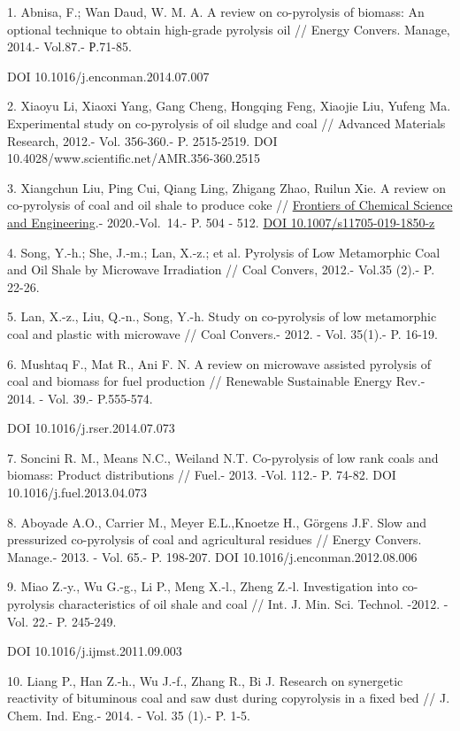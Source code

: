 \begin{references}
1. Abnisa, F.; Wan Daud, W. M. A. A review on co-pyrolysis of biomass:
An optional technique to obtain high-grade pyrolysis oil // Energy
Convers. Manage, 2014.- Vol.87.- Р.71-85.

DOI 10.1016/j.enconman.2014.07.007

2. Xiaoyu Li, Xiaoxi Yang, Gang Cheng, Hongqing Feng, Xiaojie Liu,
Yufeng Ma. Experimental study on co-pyrolysis of oil sludge and coal //
Advanced Materials Research, 2012.- Vol. 356-360.- P. 2515-2519. DOI
10.4028/www.scientific.net/AMR.356-360.2515

3. Xiangchun Liu, Ping Cui, Qiang Ling, Zhigang Zhao, Ruilun Xie. A
review on co-pyrolysis of coal and oil shale to produce coke //
\href{https://link.springer.com/journal/11705}{Frontiers of Chemical
Science and Engineering}.- 2020.-Vol.~14.- P. 504 - 512.
\href{https://doi.org/10.1007/s11705-019-1850-z}{DOI
10.1007/s11705-019-1850-z}

4. Song, Y.-h.; She, J.-m.; Lan, X.-z.; et al. Pyrolysis of Low
Metamorphic Coal and Oil Shale by Microwave Irradiation // Coal Convers,
2012.- Vol.35 (2).- P. 22-26.

5. Lan, X.-z., Liu, Q.-n., Song, Y.-h. Study on co-pyrolysis of low
metamorphic coal and plastic with microwave // Coal Convers.- 2012. -
Vol. 35(1).- P. 16-19.

6. Mushtaq F., Mat R., Ani F. N. A review on microwave assisted
pyrolysis of coal and biomass for fuel production // Renewable
Sustainable Energy Rev.- 2014. - Vol. 39.- P.555-574.

DOI 10.1016/j.rser.2014.07.073

7. Soncini R. M., Means N.C., Weiland N.T. Co-pyrolysis of low rank
coals and biomass: Product distributions // Fuel.- 2013. -Vol. 112.- P.
74-82. DOI 10.1016/j.fuel.2013.04.073

8. Aboyade A.O., Carrier M., Meyer E.L.,Knoetze H., Görgens J.F. Slow
and pressurized co-pyrolysis of coal and agricultural residues // Energy
Convers. Manage.- 2013. - Vol. 65.- P. 198-207. DOI
10.1016/j.enconman.2012.08.006

9. Miao Z.-y., Wu G.-g., Li P., Meng X.-l., Zheng Z.-l. Investigation
into co-pyrolysis characteristics of oil shale and coal // Int. J. Min.
Sci. Technol. -2012. - Vol. 22.- P. 245-249.

DOI 10.1016/j.ijmst.2011.09.003

10. Liang P., Han Z.-h., Wu J.-f., Zhang R., Bi J. Research on
synergetic reactivity of bituminous coal and saw dust during copyrolysis
in a fixed bed // J. Chem. Ind. Eng.- 2014. - Vol. 35 (1).- P. 1-5.


\end{references}
